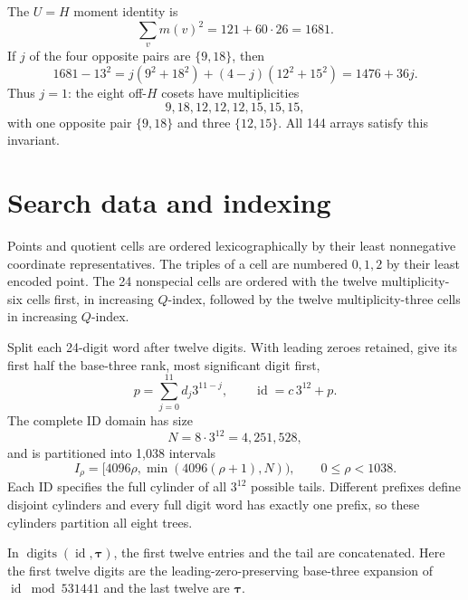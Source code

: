 \documentclass[11pt]{article}
\begin{document}
\begin{appendices}
The $U=H$ moment identity is
\[
 \sum_vm(v)^2=121+60\cdot26=1681.
\]
If $j$ of the four opposite pairs are $\{9,18\}$, then
\[
 1681-13^2=j(9^2+18^2)+(4-j)(12^2+15^2)
 =1476+36j.
\]
Thus $j=1$: the eight off-$H$ cosets have multiplicities
\begin{equation}\label{eq:Hcosets}
 9,18,12,12,12,15,15,15,
\end{equation}
with one opposite pair $\{9,18\}$ and three
$\{12,15\}$. All 144 arrays satisfy this invariant.

\section{Search data and indexing}\label{app:computation}\label{sec:search}

Points and quotient cells are ordered lexicographically by their
least nonnegative coordinate representatives. The triples of a cell are
numbered $0,1,2$ by their least encoded point. The 24 nonspecial cells
are ordered with the twelve multiplicity-six cells first, in increasing
$Q$-index, followed by the twelve multiplicity-three cells in increasing
$Q$-index.

Split each 24-digit word after twelve digits. With
leading zeroes retained, give its first half the
base-three rank, most significant digit first,
\[
 p=\sum_{j=0}^{11}d_j3^{11-j},\qquad
 \operatorname{id}=c\,3^{12}+p.
\]
The complete ID domain has size
\[
 N=8\cdot3^{12}=4{,}251{,}528,
\]
and is partitioned into 1,038 intervals
\begin{equation}\label{eq:ranges}
 I_\rho=[4096\rho,\min(4096(\rho+1),N)),\qquad0\leq \rho<1038.
\end{equation}
Each ID specifies the full cylinder of all $3^{12}$
possible tails. Different prefixes define disjoint
cylinders and every full digit word has exactly one
prefix, so these cylinders partition all eight trees.

In $\operatorname{digits}(\operatorname{id},\boldsymbol\tau)$, the
first twelve entries and the tail are concatenated.
Here the first twelve digits
are the leading-zero-preserving
base-three expansion of
$\operatorname{id}\bmod531441$
and the last twelve are
$\boldsymbol\tau$.


\end{appendices}
\end{document}
